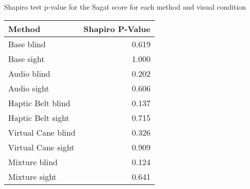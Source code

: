 
\centering
\caption{Shapiro test p-value for the Sagat score for each method and visual condition}
\label{tab:shapiro_sagat_score}
\begin{tabular}{lr}
\toprule
            Method &  Shapiro P-Value \\
\midrule
        Base blind &            0.619 \\
        Base sight &            1.000 \\
       Audio blind &            0.202 \\
       Audio sight &            0.606 \\
 Haptic Belt blind &            0.137 \\
 Haptic Belt sight &            0.715 \\
Virtual Cane blind &            0.326 \\
Virtual Cane sight &            0.909 \\
     Mixture blind &            0.124 \\
     Mixture sight &            0.641 \\
\bottomrule
\end{tabular}
